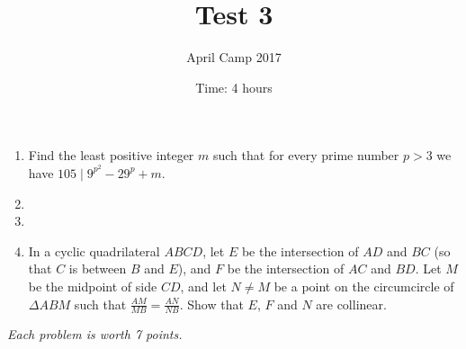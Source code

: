\documentclass[a4paper,12pt]{article}
\title{Test 3}
\date{Time: 4 hours}
\author{April Camp 2017}
\begin{document}
 \maketitle

\begin{enumerate}
	\item %
	Find the least positive integer $m$ such that for every prime number $p>3$ we have $105 \mid 9^{p^2} -29^p +m$.

	\item 
	

	\item 
	

	\item %
	In a cyclic quadrilateral $ABCD$, let $E$ be the intersection of $AD$ and $BC$ (so that $C$ is between $B$ and $E$), and $F$ be the intersection of $AC$ and $BD$. Let $M$ be the midpoint of side $CD$, and let $N\neq M$ be a point on the circumcircle of $\Delta ABM$ such that $\frac{AM}{MB}=\frac{AN}{NB}$. Show that $E$, $F$ and $N$ are collinear.

\end{enumerate}

\medskip 

\hfill \emph{Each problem is worth 7 points.}
	
\end{document}

